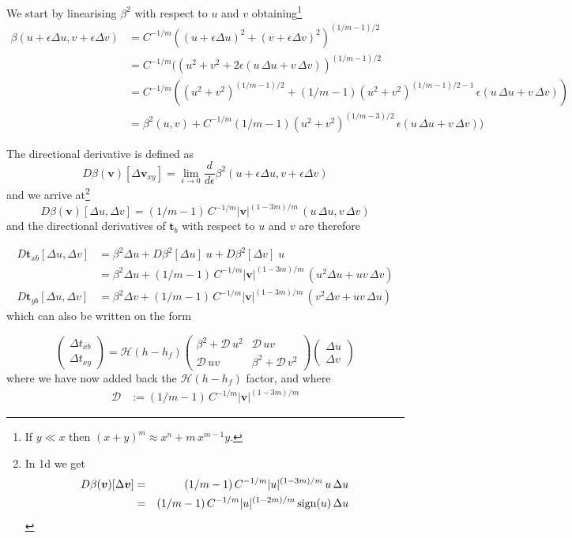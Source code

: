 \documentclass[10pt,a4paper]{book}
\newcommand{\He}{\mathcal{H}}
\begin{document}
We start by linearising $\beta^2$ with respect to $u$ and $v$
obtaining\footnote{If $y \ll x $ then
  $(x+y)^m \approx x^n+ m \, x^{m-1} y $.} 
\begin{align*}
\beta(u+\epsilon \Delta u, v+\epsilon \Delta v)
&=  C^{-1/m} ((u+\epsilon \Delta u)^2+(v+\epsilon \Delta v)^2)^{(1/m-1)/2} \\
&=  C^{-1/m} ((u^2 +v^2 + 2 \epsilon ( u\, \Delta u + v \,\Delta v))^{(1/m-1)/2} \\
&= C^{-1/m} ( (u^2+v^2)^{(1/m-1)/2}  + (1/m-1) ( u^2+v^2)^{(1/m-1)/2-1}\, \epsilon (u\, \Delta u + v \, \Delta v))\\
&= \beta^2(u,v) + C^{-1/m} (1/m-1) ( u^2+v^2)^{(1/m-3)/2}\, \epsilon (u\, \Delta u + v \, \Delta v))
\end{align*}

The directional derivative is defined as
\[
D\beta(\bm{v})[\Delta \bm{v}_{xy}]=\lim_{\epsilon \to 0} \frac{d}{d\epsilon} \beta^2(u+\epsilon \Delta u, v+\epsilon \Delta v)
\]
and we arrive at\footnote{In 1d we get
\begin{eqnarray*}
D \beta(\bm{v})[\Delta \bm{v}]
&=& (1/m-1) \, C^{-1/m}  |u|^{(1-3m)/m}\, u\, \Delta u \\
&=& (1/m-1) \, C^{-1/m}  |u|^{(1-2m)/m}\, \hbox{sign}(u)\, \Delta u \\
\end{eqnarray*}
}
\[
D \beta(\bm{v})[\Delta u, \Delta v]= (1/m-1) \, C^{-1/m}  |\bm{v}|^{(1-3m)/m}\, (u\, \Delta u , v \, \Delta v)
\]
and the directional derivatives of $\bm{t}_b$ with respect to $u$ and $v$ are therefore

\begin{align*} 
  D \bm{t}_{xb} [\Delta u, \Delta v] &= \beta^2 \Delta u +  D \beta^2 [\Delta u] \; u + D \beta^2 [\Delta v] \; u \\
                                     &= \beta^2 \Delta u +   (1/m-1) \, C^{-1/m}  |\bm{v}|^{(1-3m)/m}\, (u^2  \Delta u + u v \, \Delta v)\\
  D \bm{t}_{yb} [\Delta u, \Delta v]  &= \beta^2 \Delta v +   (1/m-1) \, C^{-1/m}  |\bm{v}|^{(1-3m)/m}\, (v^2  \Delta v + u v \, \Delta u)
\end{align*}
which can also be written on the form


\begin{equation}
\begin{pmatrix} \Delta t_{xb}  \\ \Delta t_{xy} \end{pmatrix}
=  \He(h-h_f) \begin{pmatrix} \beta^2 + \mathcal{D} \, u^2 & \mathcal{D} \, u v  \\
                \mathcal{D} \, u v    &  \beta^2 + \mathcal{D} \, v^2\end{pmatrix}
\begin{pmatrix} \Delta u  \\ \Delta v \end{pmatrix}
\end{equation}
where we have now added back the $\He(h-h_f)$ factor, and where
\begin{align*}
\mathcal{D}& := (1/m-1) \, C^{-1/m}  |\bm{v}|^{(1-3m)/m} 
\end{align*}
\end{document}
